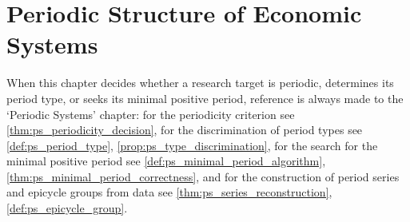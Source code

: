 \chapter{Periodic Structure of Economic Systems}

\begin{remark}\label{rem:econ_ps_hook}
When this chapter decides whether a research target is periodic, determines its period type, or seeks its minimal positive period, reference is always made to the `Periodic Systems' chapter:
for the periodicity criterion see \cref{thm:ps_periodicity_decision},
for the discrimination of period types see \cref{def:ps_period_type}, \cref{prop:ps_type_discrimination},
for the search for the minimal positive period see \cref{def:ps_minimal_period_algorithm}, \cref{thm:ps_minimal_period_correctness},
and for the construction of period series and epicycle groups from data see \cref{thm:ps_series_reconstruction}, \cref{def:ps_epicycle_group}.
\end{remark}

